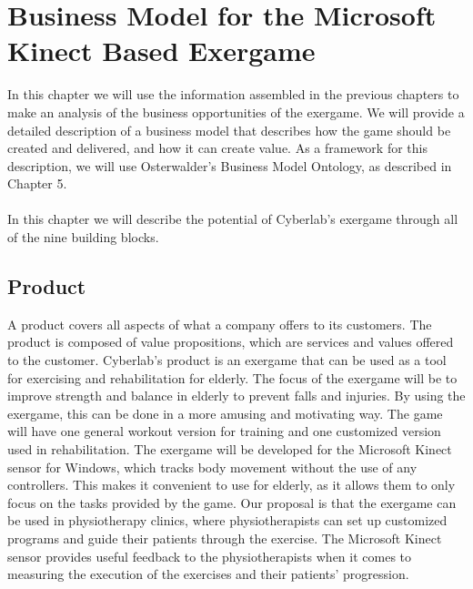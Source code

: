 \chapter{Business Model for the Microsoft Kinect Based Exergame}
In this chapter we will use the information assembled in the previous chapters to  make an analysis of the business opportunities of the exergame. We will provide a detailed description of a business model that describes how the game should be created and delivered, and how it can create value. As a framework for this description, we will use Osterwalder's Business Model Ontology, as described in Chapter 5. \\ \\ 
In this chapter we will describe the potential of Cyberlab's exergame through all of the nine building blocks.  

\section{Product}
A product covers all aspects of what a company offers to its customers. The product is composed of value propositions, which are services and values offered to the customer. Cyberlab’s product is an exergame that can be used as a tool for exercising and rehabilitation for elderly. The focus of the exergame will be to improve strength and balance in elderly to prevent falls and injuries. By using the exergame, this can be done in a more amusing and motivating way. The game will have one general workout version for training and one customized version used in rehabilitation. The exergame will be developed for the Microsoft Kinect sensor for Windows, which tracks body movement without the use of any controllers. This makes it convenient to use for elderly, as it allows them to only focus on the tasks provided by the game. Our proposal is that the exergame can be used in physiotherapy clinics, where physiotherapists can set up customized programs and guide their patients through the exercise. The Microsoft Kinect sensor provides useful feedback to the physiotherapists when it comes to measuring the execution of the exercises and their patients' progression. 
